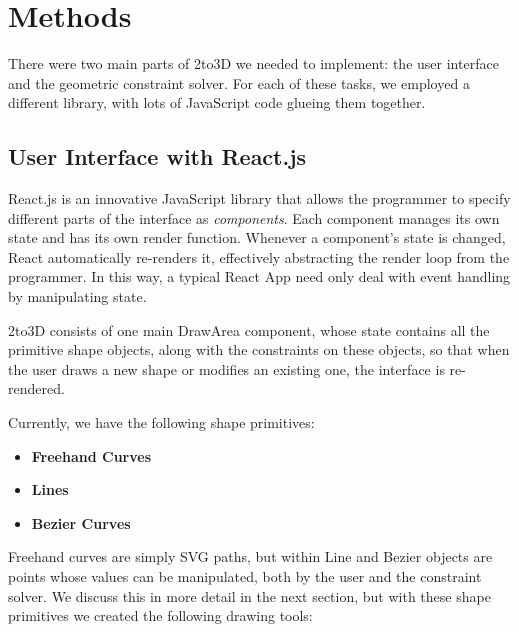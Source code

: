 \section{Methods}

There were two main parts of 2to3D we needed to implement: the user interface and the geometric constraint solver. For each of these tasks, we employed a different library, with lots of JavaScript code glueing them together.

\subsection*{User Interface with React.js}

React.js is an innovative JavaScript library that allows the programmer to specify different parts of the interface as {\it components}. Each component manages its own state and has its own render function. Whenever a component's state is changed, React automatically re-renders it, effectively abstracting the render loop from the programmer. In this way, a typical React App need only deal with event handling by manipulating state.

2to3D consists of one main DrawArea component, whose state contains all the primitive shape objects, along with the constraints on these objects, so that when the user draws a new shape or modifies an existing one, the interface is re-rendered.


Currently, we have the following shape primitives:

\begin{itemize}
\item {\bf Freehand Curves}
\item {\bf Lines}
\item {\bf Bezier Curves}
\end{itemize}

Freehand curves are simply SVG paths, but within Line and Bezier objects are points whose values can be manipulated, both by the user and the constraint solver. We discuss this in more detail in the next section, but with these shape primitives we created the following drawing tools:

